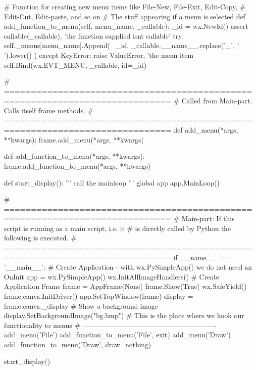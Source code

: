 \begin{python}[moreemph={[4], 46, 48},caption={Step1.py - The program frame},label=LISTING_STEP1_PY_WXPYSIMMPLEAPP]
    # Function for creating new menu items like File-New, File-Exit, Edit-Copy, 
    # Edit-Cut, Edit-paste, and so on
    # The stuff appearing if a menu is selected
    def add_function_to_menu(self, menu_name, _callable):
        _id = wx.NewId()
        assert callable(_callable), 'the function supplied isnt callable'
        try:
            self._menus[menu_name].Append( \
                        _id, 
                        _callable.__name__.replace('_', ' ').lower() )
        except KeyError:
            raise ValueError, 'the menu item %
        self.Bind(wx.EVT_MENU, _callable, id=_id)


# =============================================================================
# Called from Main-part. Calls itself frame methods.
# =============================================================================
def add_menu(*args, **kwargs):
    frame.add_menu(*args, **kwargs)
    
def add_function_to_menu(*args, **kwargs):
    frame.add_function_to_menu(*args, **kwargs)

def start_display():    
    '''
    call the mainloop
    '''
    global app
    app.MainLoop()
    
# =============================================================================
# Main-part: If this script is running as a main script, i.e. it 
# is directly called by Python the following is executed.
# =============================================================================
if __name__ == '__main__':
    # Create Application - with wx.PySimpleApp() we do not need an OnInit
    app = wx.PySimpleApp()
    wx.InitAllImageHandlers()
    # Create Application Frame
    frame = AppFrame(None)
    frame.Show(True)
    wx.SafeYield()
    frame.canva.InitDriver()
    app.SetTopWindow(frame)
    display = frame.canva._display
    # Show a background image
    display.SetBackgroundImage("bg.bmp")  
    # This is the place where we hook our functionality to menus
    # ----------------------------------------------------------
    add_menu('File')
    add_function_to_menu('File',  exit)
    add_menu('Draw')
    add_function_to_menu('Draw', draw_nothing)
    
    start_display()
\end{python}

